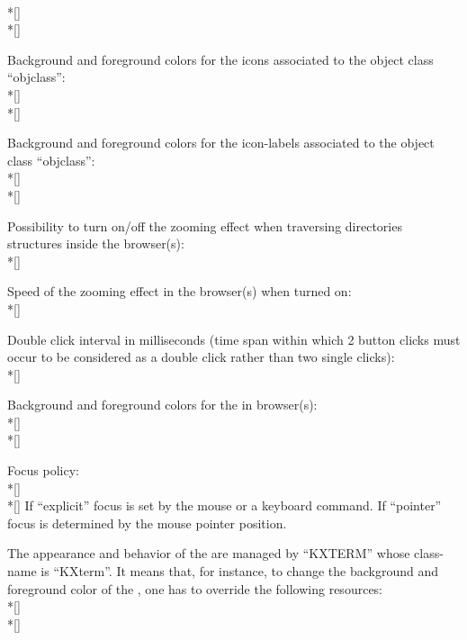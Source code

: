 \begin{UL}
\\*[\smallskipamount]\texttt{}
\\*[\smallskipamount]\texttt{}
\item
Background and foreground colors for the icons associated to the object
class ``objclass'':
\\*[\smallskipamount]\texttt{} 
\\*[\smallskipamount]\texttt{} 
\item
Background and foreground colors for the icon-labels associated to the object
class ``objclass'':
\\*[\smallskipamount]\texttt{}
\\*[\smallskipamount]\texttt{}
\item
Possibility to turn on/off the zooming effect when traversing directories
structures inside the browser(s):
\\*[\smallskipamount]\texttt{}
\item
Speed of the zooming effect in the browser(s) when turned on:
\\*[\smallskipamount]\texttt{}
\item
Double click interval in milliseconds (time span within which 2 button clicks
must occur to be considered as a double click rather than two single clicks):
\\*[\smallskipamount]\texttt{}
\item
Background and foreground colors for the \BW{} in browser(s):
\\*[\smallskipamount]\texttt{}
\\*[\smallskipamount]\texttt{}
\item
Focus policy:
\\*[\smallskipamount]\texttt{}\\*[\smallskipamount]
If ``explicit'' focus is set by the mouse or a keyboard command. If ``pointer''
focus is determined by the mouse pointer position.
\end{UL}

The appearance and behavior of the \EW{} are managed by ``KXTERM'' whose
class-name is ``KXterm''. It means that, for instance, to change the
background and foreground color of the \EW{}, one has to override the
following resources:
\\*[\smallskipamount]\texttt{}
\\*[\smallskipamount]\texttt{}

